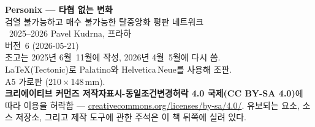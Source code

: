 \thispagestyle{empty}
\ifdefined\printmode\vspace*{\fill}\else{}\fi
\begin{flushleft}\small\sffamily
\textbf{Personix --- 타협 없는 변화}\\[0.3em]
검열 불가능하고 매수 불가능한 탈중앙화 평판 네트워크\\[1.4em]

\textcopyright\ 2025--2026 Pavel Kudrna, 프라하\\[0.4em]

버전~6 (2026-05-21)\\
초고는 2025년 6월~11월에 작성, 2026년 4월~5월에 다시 씀.\\[1.4em]

\LaTeX{}(Tectonic)로 Palatino와 Helvetica\,Neue를 사용해 조판.\\
A5 가로판 (210\,$\times$\,148\,mm).\\[1.4em]

\textbf{크리에이티브 커먼즈 저작자표시-동일조건변경허락 4.0
국제(CC BY-SA 4.0)}에 따라 이용을 허락함 ---
\href{https://creativecommons.org/licenses/by-sa/4.0/}{creativecommons.org/licenses/by-sa/4.0/}.
유보되는 요소, 소스 저장소, 그리고 제작 도구에 관한 주석은
이 책 뒤쪽에 실려 있다.
\end{flushleft}
\ifdefined\printmode\else{}\fi
\clearpage
